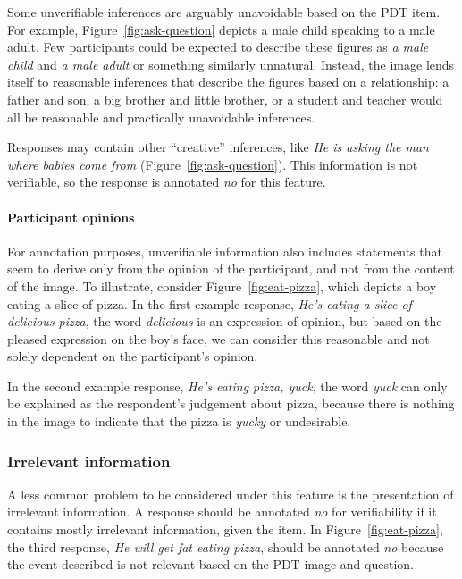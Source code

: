 \documentclass[12pt,notitlepage]{article}
\begin{document}
Some unverifiable inferences are arguably unavoidable based on the PDT item. For example, Figure~\ref{fig:ask-question} depicts a male child speaking to a male adult. Few participants could be expected to describe these figures as \textit{a male child} and \textit{a male adult} or something similarly unnatural. Instead, the image lends itself to reasonable inferences that describe the figures based on a relationship: a father and son, a big brother and little brother, or a student and teacher would all be reasonable and practically unavoidable inferences. 

Responses may contain other ``creative'' inferences, like \textit{He is asking the man where babies come from} (Figure~\ref{fig:ask-question}). This information is not verifiable, so the response is annotated \textit{no} for this feature.

\paragraph{Participant opinions} For annotation purposes, unverifiable information also includes statements that seem to derive only from the opinion of the participant, and not from the content of the image. To illustrate, consider Figure~\ref{fig:eat-pizza}, which depicts a boy eating a slice of pizza. In the first example response, \textit{He's eating a slice of delicious pizza}, the word \textit{delicious} is an expression of opinion, but based on the pleased expression on the boy's face, we can consider this reasonable and not solely dependent on the participant's opinion.

In the second example response, \textit{He's eating pizza, yuck}, the word \textit{yuck} can only be explained as the respondent's judgement about pizza, because there is nothing in the image to indicate that the pizza is \textit{yucky} or undesirable. 

\subsubsection{Irrelevant information} 
A less common problem to be considered under this feature is the presentation of irrelevant information. A response should be annotated \textit{no} for verifiability if it contains mostly irrelevant information, given the item. In Figure~\ref{fig:eat-pizza}, the third response, \textit{He will get fat eating pizza}, should be annotated \textit{no} because the event described is not relevant based on the PDT image and question.
\end{document}
